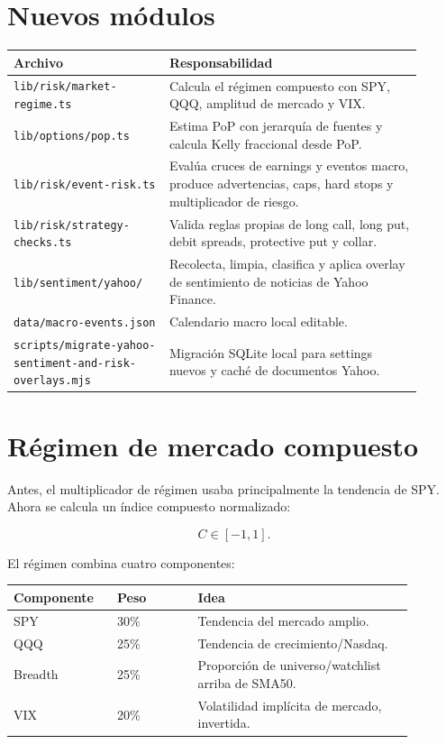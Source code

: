 \documentclass[11pt,letterpaper]{article}
\begin{document}
\section{Nuevos m\'odulos}

\begin{longtable}{p{0.33\linewidth} p{0.57\linewidth}}
\toprule
\textbf{Archivo} & \textbf{Responsabilidad} \\
\midrule
\texttt{lib/risk/market-regime.ts} & Calcula el r\'egimen compuesto con SPY,
QQQ, amplitud de mercado y VIX. \\
\texttt{lib/options/pop.ts} & Estima PoP con jerarqu\'ia de fuentes y calcula
Kelly fraccional desde PoP. \\
\texttt{lib/risk/event-risk.ts} & Eval\'ua cruces de earnings y eventos macro,
produce advertencias, caps, hard stops y multiplicador de riesgo. \\
\texttt{lib/risk/strategy-checks.ts} & Valida reglas propias de long call, long
put, debit spreads, protective put y collar. \\
\texttt{lib/sentiment/yahoo/} & Recolecta, limpia, clasifica y aplica overlay
de sentimiento de noticias de Yahoo Finance. \\
\texttt{data/macro-events.json} & Calendario macro local editable. \\
\texttt{scripts/migrate-yahoo-sentiment-and-risk-overlays.mjs} & Migraci\'on
SQLite local para settings nuevos y cach\'e de documentos Yahoo. \\
\bottomrule
\end{longtable}

\section{R\'egimen de mercado compuesto}

Antes, el multiplicador de r\'egimen usaba principalmente la tendencia de SPY.
Ahora se calcula un \'indice compuesto normalizado:

\[
C \in [-1,1].
\]

El r\'egimen combina cuatro componentes:

\begin{longtable}{p{0.22\linewidth} p{0.18\linewidth} p{0.48\linewidth}}
\toprule
\textbf{Componente} & \textbf{Peso} & \textbf{Idea} \\
\midrule
SPY & 30\% & Tendencia del mercado amplio. \\
QQQ & 25\% & Tendencia de crecimiento/Nasdaq. \\
Breadth & 25\% & Proporci\'on de universo/watchlist arriba de SMA50. \\
VIX & 20\% & Volatilidad impl\'icita de mercado, invertida. \\
\bottomrule
\end{longtable}
\end{document}
